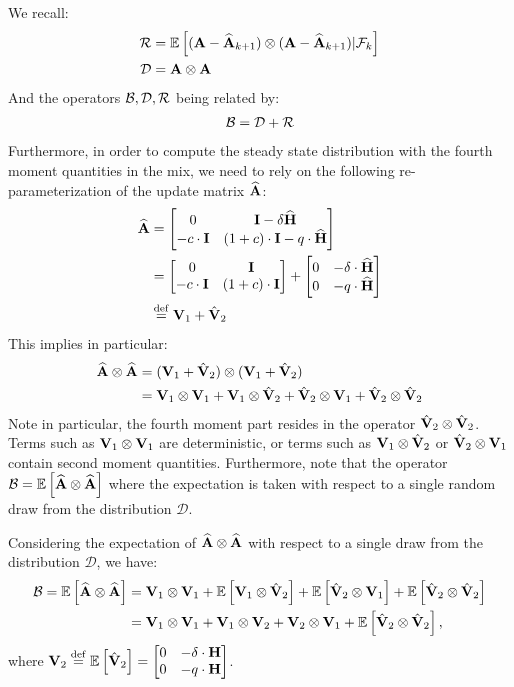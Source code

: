 \fi
We recall:
\begin{align*}
\RT&=\E{(\A-\Ah_{k+1})\otimes(\A-\Ah_{k+1})|\mathcal{F}_k}\\
\DT&=\A\otimes\A
\end{align*}
And the operators $\BT,\DT,\RT$ being related by:
\begin{align*}
\BT=\DT+\RT
\end{align*}
Furthermore, in order to compute the steady state distribution with the fourth moment quantities in the mix, we need to rely on the following re-parameterization of the update matrix $\Ah$:
\begin{align*}
\Ah&=\begin{bmatrix}0&\eye-\delta\widehat{\H}\\-c\cdot\eye&(1+c)\cdot\eye-\g\cdot\widehat{\H}\end{bmatrix}\\
&=\begin{bmatrix}0&\eye\\-c\cdot\eye&(1+c)\cdot\eye\end{bmatrix}+\begin{bmatrix}0&-\delta\cdot\widehat{\H}\\0&-\g\cdot\widehat{\H}\end{bmatrix}\\
&\defeq \V_1+\Vh_2
\end{align*}
This implies in particular:
\begin{align*}
\Ah\otimes\Ah&=(\V_1+\Vh_2)\otimes(\V_1+\Vh_2)\\
&=\V_1\otimes\V_1 + \V_1\otimes\Vh_2 + \Vh_2\otimes\V_1 + \Vh_2\otimes\Vh_2
\end{align*}
Note in particular, the fourth moment part resides in the operator $\Vh_2\otimes\Vh_2$. Terms such as $\V_1\otimes\V_1$ are deterministic, or terms such as $\V_1\otimes\Vh_2$ or $\Vh_2\otimes\V_1$ contain second moment quantities. Furthermore, note that the operator $\BT=\E{\Ah\otimes\Ah}$ where the expectation is taken with respect to a single random draw from the distribution $\mathcal{D}$.

Considering the expectation of $\Ah\otimes\Ah$ with respect to a single draw from the distribution $\mathcal{D}$, we have:
\begin{align}
\BT=\E{\Ah\otimes\Ah}&=\V_1\otimes\V_1 + \E{\V_1\otimes\Vh_2} + \E{\Vh_2\otimes\V_1} + \E{\Vh_2\otimes\Vh_2}\nonumber\\
&=\V_1\otimes\V_1 + \V_1\otimes\V_2 + \V_2\otimes\V_1 + \E{\Vh_2\otimes\Vh_2},\nonumber
\end{align}
where $\V_2\defeq\E{\Vh_2} =\begin{bmatrix}0&-\delta\cdot\H\\0&-\g\cdot\H\end{bmatrix}$. 

